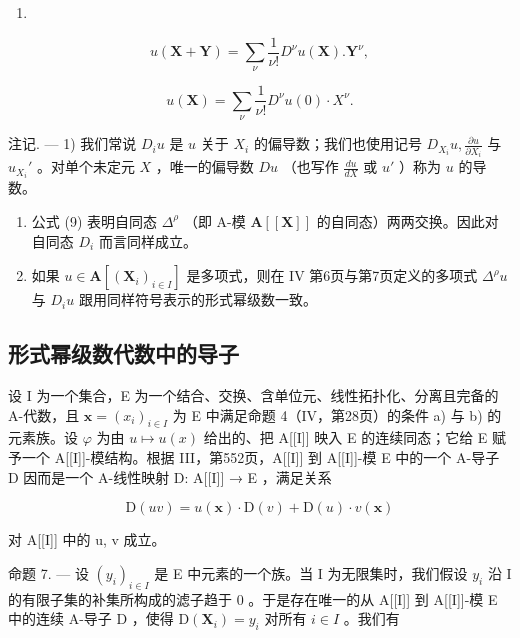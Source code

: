 \begin{enumerate}
\def\labelenumi{(\arabic{enumi})}
\setcounter{enumi}{12}
\tightlist
\item
\end{enumerate}

\[
u (\mathbf {X} + \mathbf {Y}) = \sum_ {\nu} \frac {1}{\nu !} D ^ {\nu} u (\mathbf {X}). \mathbf {Y} ^ {\nu},
\]

\[
u (\mathbf {X}) = \sum_ {\nu} \frac {1}{\nu !} D ^ {\nu} u (0) \cdot X ^ {\nu}.\tag{14}
\]

注记. --- 1) 我们常说 \(D_i u\) 是 \(u\) 关于 \(X_i\) 的偏导数；我们也使用记号 \(D_{X_i} u, \frac{\partial u}{\partial X_i}\) 与 \(u_{X_i}'\) 。对单个未定元 \(X\) ，唯一的偏导数 \(Du\) （也写作 \(\frac{du}{dX}\) 或 \(u'\) ）称为 \(u\) 的导数。

\begin{enumerate}
\def\labelenumi{\arabic{enumi})}
\setcounter{enumi}{1}
\item
  公式 (9) 表明自同态 \(\Delta^{\rho}\) （即 A-模 \(\mathbf{A}[[\mathbf{X}]]\) 的自同态）两两交换。因此对自同态 \(D_i\) 而言同样成立。
\item
  如果 \(u \in \mathbf{A}[(\mathbf{X}_i)_{i \in I}]\) 是多项式，则在 IV 第6页与第7页定义的多项式 \(\Delta^{\rho} u\) 与 \(D_i u\) 跟用同样符号表示的形式幂级数一致。
\end{enumerate}

\subsection{形式幂级数代数中的导子}

设 I 为一个集合，E 为一个结合、交换、含单位元、线性拓扑化、分离且完备的 A-代数，且 \(\mathbf{x} = (x_{i})_{i \in I}\) 为 E 中满足命题 4（IV，第28页）的条件 a) 与 b) 的元素族。设 \(\varphi\) 为由 \(u \mapsto u(x)\) 给出的、把 A{[}{[}I{]}{]} 映入 E 的连续同态；它给 E 赋予一个 A{[}{[}I{]}{]}-模结构。根据 III，第552页，A{[}{[}I{]}{]} 到 A{[}{[}I{]}{]}-模 E 中的一个 A-导子 D 因而是一个 A-线性映射 D: A{[}{[}I{]}{]} → E ，满足关系

\[
\mathrm{D} (u v) = u (\mathbf {x}) \cdot \mathrm{D} (v) + \mathrm{D} (u) \cdot v (\mathbf {x})\tag{15}
\]

对 A{[}{[}I{]}{]} 中的 u, v 成立。

命题 7. --- 设 \((y_{i})_{i\in I}\) 是 E 中元素的一个族。当 I 为无限集时，我们假设 \(y_{i}\) 沿 I 的有限子集的补集所构成的滤子趋于 0 。于是存在唯一的从 A{[}{[}I{]}{]} 到 A{[}{[}I{]}{]}-模 E 中的连续 A-导子 D ，使得 \(\mathrm{D}(\mathbf{X}_{i})=y_{i}\) 对所有 \(i\in I\) 。我们有

